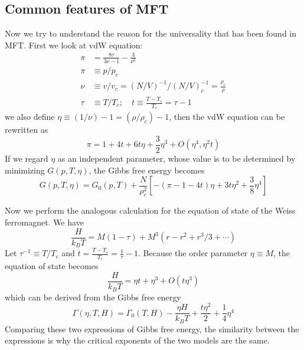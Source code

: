 \documentclass[12pt,titlepage]{article}
\numberwithin{equation}{section}
\begin{document}
\subsection{Common features of MFT}
Now we try to understand the reason for the universality that has been found in MFT. First we look at vdW equation:
\begin{equation}
\begin{aligned} \pi &=\frac{8 \tau}{3 \nu-1}-\frac{3}{\nu^{2}} \\ \pi & \equiv p / p_{c} \\ \nu & \equiv v / v_{c}=(N / V)^{-1} /(N / V)_{c}^{-1}=\frac{\rho_{c}}{\rho} \\ \tau & \equiv T / T_{c} ; \quad t \equiv \frac{T-T_{c}}{T_{c}}=\tau-1 \end{aligned}
\end{equation}
we also define $\eta \equiv(1 / \nu)-1=\left(\rho / \rho_{\mathrm{c}}\right)-1$, then the vdW equation can be rewritten as
\begin{equation}
\pi=1+4 t+6 t \eta+\frac{3}{2} \eta^{3}+O\left(\eta^{4}, \eta^{2} t\right)
\end{equation}
If we regard $\eta$ as an independent parameter, whose value is to be determined by minimizing $G(p,T,\eta)$, the Gibbs free energy becomes
\begin{equation}
G(p, T, \eta)=G_{0}(p, T)+\frac{N}{\rho_{c}^{2}}\left[-(\pi-1-4 t) \eta+3 t \eta^{2}+\frac{3}{8} \eta^{4}\right]
\end{equation}

Now we perform the analogous calculation for the equation of state of the Weiss ferromagnet. We have
\begin{equation}
\frac{H}{k_{B} T}=M(1-\tau)+M^{3}\left(r-r^{2}+r^{3} / 3+\cdots\right)
\end{equation}
Let $\tau^{-1} \equiv T / T_{c}$ and $t=\frac{T-T_{c}}{T_{c}}=\frac{1}{\tau}-1$. Because the order parameter $\eta \equiv M$, the equation of state becomes
\begin{equation}
\frac{H}{k_{B} T}=\eta t+\eta^{3}+O\left(t \eta^{3}\right)
\end{equation}
which can be derived from the Gibbs free energy
\begin{equation}
\Gamma(\eta, T, H)=\Gamma_{0}(T, H)-\frac{\eta H}{k_{B} T}+\frac{t \eta^{2}}{2}+\frac{1}{4} \eta^{4}
\end{equation}
Comparing these two expressions of Gibbs free energy, the similarity between the expressions is why the critical exponents of the two models are the same.
\end{document}
